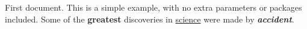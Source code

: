 \documentclass{article}
\begin{document}
First document. This is a simple example, with no 
extra parameters or packages included.
Some of the \textbf{greatest}
discoveries in \underline{science} 
were made by \textbf{\textit{accident}}.
\end{document}

